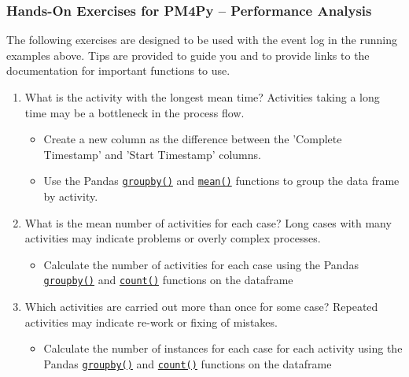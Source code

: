 \begin{tcolorbox}[colback=code]
\subsubsection*{Hands-On Exercises for PM4Py -- Performance Analysis}

The following exercises are designed to be used with the event log in the running examples above. Tips are provided to guide you and to provide links to the documentation for important functions to use.

\begin{enumerate}
   \item What is the activity with the longest mean time? Activities taking a long time may be a bottleneck in the process flow.
   \begin{itemize}
       \item Create a new column as the difference between the 'Complete Timestamp' and 'Start Timestamp' columns.
       \item Use the Pandas \href{https://pandas.pydata.org/docs/reference/api/pandas.DataFrame.groupby.html}{\texttt{groupby()}} and \href{https://pandas.pydata.org/docs/reference/api/pandas.DataFrame.mean.html}{\texttt{mean()}} functions to group the data frame by activity.
   \end{itemize}
   \item What is the mean number of activities for each case? Long cases with many activities may indicate problems or overly complex processes.
   \begin{itemize}
       \item Calculate the number of activities for each case using the Pandas \href{https://pandas.pydata.org/docs/reference/api/pandas.DataFrame.groupby.html}{\texttt{groupby()}} and \href{https://pandas.pydata.org/docs/reference/api/pandas.DataFrame.count.html}{\texttt{count()}} functions on the dataframe
   \end{itemize}
   \item Which activities are carried out more than once for some case? Repeated activities may indicate re-work or fixing of mistakes.
   \begin{itemize}
       \item Calculate the number of instances for each case for each activity using the Pandas \href{https://pandas.pydata.org/docs/reference/api/pandas.DataFrame.groupby.html}{\texttt{groupby()}} and \href{https://pandas.pydata.org/docs/reference/api/pandas.DataFrame.count.html}{\texttt{count()}} functions on the dataframe
   \end{itemize}
\end{enumerate}
\end{tcolorbox}

